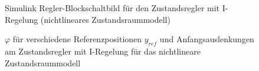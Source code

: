 \begin{figure}[H]
    \centering
    \caption[Regler mit I-Regelung Simulink (nichtlinear)]{Simulink Regler-Blockschaltbild für den Zustandsregler mit I-Regelung (nichtlineares Zustandsraummodell)}
    \label{fig:Bild36}
\end{figure}

\begin{figure}[H]
    \centering
    \caption[$\varphi$ für Regler mit I-Regelung (nichtlinear)]{$\varphi$ für verschiedene Referenzpositionen $y_{ref}$ und Anfangsauslenkungen am Zustandsregler mit I-Regelung für das nichtlineare Zustandsraummodell}
    \label{fig:Bild37}
\end{figure}

